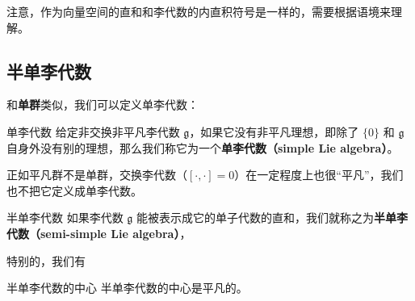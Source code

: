 注意，作为向量空间的直和和李代数的内直积符号是一样的，需要根据语境来理解。

\subsection{半单李代数}

和\textbf{单群}类似，我们可以定义单李代数：

\begin{definition}{单李代数}
给定非交换非平凡李代数 $\mathfrak{g}$，如果它没有非平凡理想，即除了 $\{0\}$ 和 $\mathfrak{g}$ 自身外没有别的理想，那么我们称它为一个\textbf{单李代数（simple Lie algebra）}。
\end{definition}

正如平凡群不是单群，交换李代数（$[\cdot, \cdot] = 0$）在一定程度上也很“平凡”，我们也不把它定义成单李代数。


\begin{definition}{半单李代数}\label{def_LieSub_1}
如果李代数 $\mathfrak{g}$ 能被表示成它的单子代数的直和，我们就称之为\textbf{半单李代数（semi-simple Lie algebra）}，
\end{definition}

特别的，我们有
\begin{theorem}{半单李代数的中心}
半单李代数的中心是平凡的。
\end{theorem}


